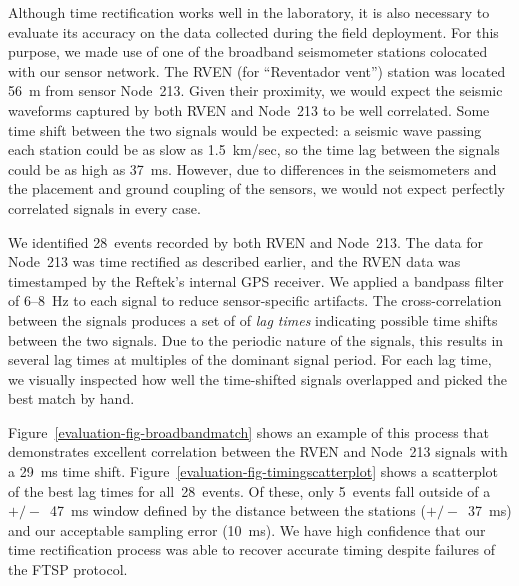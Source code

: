 Although time rectification works well in the laboratory, it is also
necessary to evaluate its accuracy on the data collected during the field
deployment. For this purpose, we made use of one of the broadband seismometer
stations colocated with our sensor network. The RVEN (for ``Reventador
vent'') station was located 56~m from sensor Node~213. Given their proximity,
we would expect the seismic waveforms captured by both RVEN and Node~213 to
be well correlated. Some time shift between the two signals would be
expected: a seismic wave passing each station could be as slow as 1.5~km/sec,
so the time lag between the signals could be as high as 37~ms. However, due
to differences in the seismometers and the placement and ground coupling of
the sensors, we would not expect perfectly correlated signals in every case.

We identified 28~events recorded by both RVEN and Node~213. The data for
Node~213 was time rectified as described earlier, and the RVEN data was
timestamped by the Reftek's internal GPS receiver. We applied a bandpass
filter of 6--8~Hz to each signal to reduce sensor-specific artifacts. The
cross-correlation between the signals produces a set of of \textit{lag times}
indicating possible time shifts between the two signals. Due to the periodic
nature of the signals, this results in several lag times at multiples of the
dominant signal period. For each lag time, we visually inspected how well the
time-shifted signals overlapped and picked the best match by hand.

Figure~\ref{evaluation-fig-broadbandmatch} shows an example of this process
that demonstrates excellent correlation between the RVEN and Node~213 signals
with a 29~ms time shift. Figure~\ref{evaluation-fig-timingscatterplot} shows
a scatterplot of the best lag times for all~28~events. Of these, only
5~events fall outside of a $+/-$~47~ms window defined by the distance between
the stations ($+/-$~37~ms) and our acceptable sampling error (10~ms). We have
high confidence that our time rectification process was able to recover
accurate timing despite failures of the FTSP protocol.
